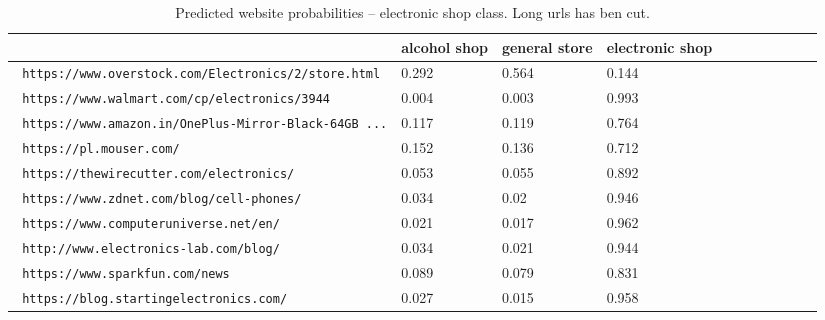 \begin{table}[!hbt]
    \caption{ Predicted website probabilities -- electronic shop class.
    Long urls has ben cut.
    \label{table:res3}
    }
\footnotesize
\begin{center}
    \begin{tabular}{|l|l|l|l|l|l|l|l|l|l|l|}
    \hline
        & alcohol shop & general store & electronic shop \\
    \hline
\verb| https://www.overstock.com/Electronics/2/store.html | &
0.292&0.564&0.144
\\
\verb| https://www.walmart.com/cp/electronics/3944 | &
0.004&0.003&0.993
\\
\verb| https://www.amazon.in/OnePlus-Mirror-Black-64GB ...| &
0.117&0.119&0.764
\\
\verb| https://pl.mouser.com/ | &
0.152&0.136&0.712
\\
\verb| https://thewirecutter.com/electronics/ | &
0.053&0.055&0.892
\\
\verb| https://www.zdnet.com/blog/cell-phones/ | &
0.034&0.02&0.946
\\
\verb| https://www.computeruniverse.net/en/ | &
0.021&0.017&0.962
\\
\verb| http://www.electronics-lab.com/blog/ | &
0.034&0.021&0.944
\\
\verb| https://www.sparkfun.com/news | &
0.089&0.079&0.831
\\
\verb| https://blog.startingelectronics.com/ | &
0.027&0.015&0.958
\\
    \hline
    \end{tabular}
\end{center}
\end{table}
